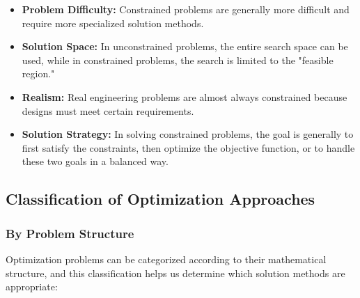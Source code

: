 \begin{itemize}
    \item \textbf{Problem Difficulty:} Constrained problems are generally more difficult and require more specialized solution methods.
    
    \item \textbf{Solution Space:} In unconstrained problems, the entire search space can be used, while in constrained problems, the search is limited to the "feasible region."
    
    \item \textbf{Realism:} Real engineering problems are almost always constrained because designs must meet certain requirements.
    
    \item \textbf{Solution Strategy:} In solving constrained problems, the goal is generally to first satisfy the constraints, then optimize the objective function, or to handle these two goals in a balanced way.
\end{itemize}


\subsection{Classification of Optimization Approaches}

\subsubsection{By Problem Structure}
Optimization problems can be categorized according to their mathematical structure, and this classification helps us determine which solution methods are appropriate:

